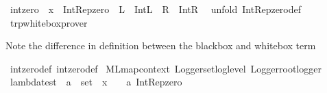 \begin{isabellebody}
\isamarkupfalse%
\ int{\isacharunderscore}{\kern0pt}zero{\isacharprime}{\kern0pt}\ \ x\ {\isacharequal}{\kern0pt}\ Int{\isacharunderscore}{\kern0pt}Rep{\isacharunderscore}{\kern0pt}zero\ \ L\ {\isacharequal}{\kern0pt}\ Int{\isachardot}{\kern0pt}L\ \ R\ {\isacharequal}{\kern0pt}\ Int{\isachardot}{\kern0pt}R\isanewline
\ \ unfold\ Int{\isacharunderscore}{\kern0pt}Rep{\isacharunderscore}{\kern0pt}zero{\isacharunderscore}{\kern0pt}def\ {\isacharbang}{\kern0pt}\ \isanewline
%
\isadelimproof
\ \ %
\endisadelimproof
%
\isatagproof
{}\isamarkupfalse%
\ trp{\isacharunderscore}{\kern0pt}whitebox{\isacharunderscore}{\kern0pt}prover%
\endisatagproof
{\isafoldproof}%
%
\isadelimproof
%
\endisadelimproof
%
\begin{isamarkuptext}%
Note the difference in definition between the blackbox and whitebox term%
\end{isamarkuptext}\isamarkuptrue%
\isamarkupfalse%
\ int{\isacharunderscore}{\kern0pt}zero{\isacharunderscore}{\kern0pt}def\ int{\isacharunderscore}{\kern0pt}zero{\isacharprime}{\kern0pt}{\isacharunderscore}{\kern0pt}def\isanewline
\isanewline
{}\isamarkupfalse%
\ {\isacharbrackleft}{\kern0pt}{\isacharbrackleft}{\kern0pt}ML{\isacharunderscore}{\kern0pt}map{\isacharunderscore}{\kern0pt}context\ {\isacartoucheopen}Logger{\isachardot}{\kern0pt}set{\isacharunderscore}{\kern0pt}log{\isacharunderscore}{\kern0pt}level\ Logger{\isachardot}{\kern0pt}root{\isacharunderscore}{\kern0pt}logger\ {}{}{}{}{}{}{}{\isacartoucheclose}{\isacharbrackright}{\kern0pt}{\isacharbrackright}{\kern0pt}\isanewline
{}\isamarkupfalse%
\ lambdatest\ {\isacharcolon}{\kern0pt}{\isacharcolon}{\kern0pt}\ {\isachardoublequoteopen}{\isacharprime}{\kern0pt}a\ {\isasymRightarrow}\ set{\isachardoublequoteclose}\ \ x\ {\isacharequal}{\kern0pt}\ {\isachardoublequoteopen}{\isasymlambda}{\isacharparenleft}{\kern0pt}{\isacharunderscore}{\kern0pt}\ {\isacharcolon}{\kern0pt}{\isacharcolon}{\kern0pt}\ {\isacharprime}{\kern0pt}a{\isacharparenright}{\kern0pt}{\isachardot}{\kern0pt}\ Int{\isacharunderscore}{\kern0pt}Rep{\isacharunderscore}{\kern0pt}zero{\isachardoublequoteclose}\isanewline
\ \ {\isacharbang}{\kern0pt}\ \ \isanewline
%
\isadelimproof
\ \ %
\endisadelimproof
%
\isatagproof
{}\isamarkupfalse%

\end{isabellebody}
